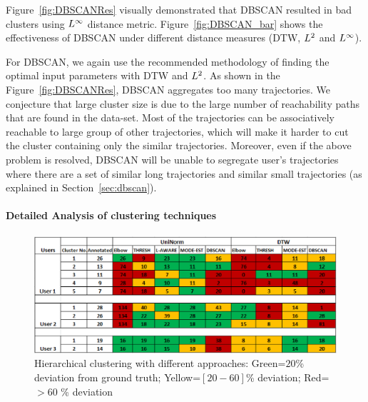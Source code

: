 Figure~\ref{fig:DBSCANRes} visually demonstrated that DBSCAN resulted in bad clusters using $L^\infty$ distance metric. Figure~\ref{fig:DBSCAN_bar} shows the effectiveness of DBSCAN under different distance measures (DTW, $L^2$ and $L^\infty$). 

For DBSCAN, we again use the recommended  methodology of finding the optimal input parameters with DTW and $L^2$. As shown in the Figure~\ref{fig:DBSCANRes}, DBSCAN aggregates too many trajectories. We conjecture that large cluster size is due to the large number of reachability paths that are found in the data-set. Most of the trajectories can be associatively reachable to large group of other trajectories, which will make it harder to cut the cluster containing only the similar trajectories. Moreover, even if the above problem is resolved, DBSCAN will be unable to segregate user's trajectories where there are a set of similar long trajectories and similar small trajectories (as explained in Section~\ref{sec:dbscan}).

\paragraph{Detailed Analysis of clustering techniques}
\label{sec:hierConfs}
\begin{figure}
        \centering
        \includegraphics[scale=0.7]{figs/table.eps}
        \caption{Hierarchical clustering with different approaches: Green=$20$\% deviation from ground truth; Yellow=$\left[20-60\right]$\% deviation; Red= $> 60$ \% deviation}
        \label{fig:table}
 \end{figure}

